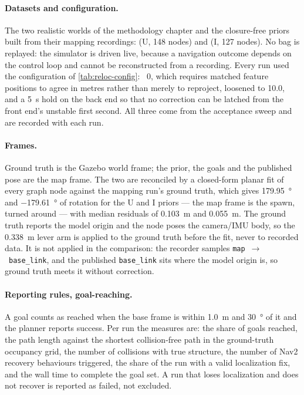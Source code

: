 \documentclass[11pt,a4paper,notitlepage]{report}
\begin{document}
\paragraph{Datasets and configuration.} The two realistic worlds of the
methodology chapter and the closure-free priors built from their mapping
recordings:  (U, 148 nodes) and
 (I, 127 nodes). No bag is replayed:
the simulator is driven live, because a navigation outcome depends on the
control loop and cannot be reconstructed from a recording. Every run used the
configuration of \cref{tab:reloc-config}: ~0, which
requires matched feature positions to agree in metres rather than merely to
reproject,  loosened to 10.0, and a
\SI{5}{\second} hold on the back end so that no correction can be latched from
the front end's unstable first second. All three come from
the acceptance sweep and are recorded with each run.

\paragraph{Frames.} Ground truth is the Gazebo world frame; the prior, the
goals and the published pose are the map frame. The two are reconciled by a
closed-form planar fit of every graph node against the mapping run's ground
truth, which gives \SI{179.95}{\degree} and \SI{-179.61}{\degree} of rotation
for the U and I priors --- the map frame is the spawn, turned around --- with
median residuals of \SI{0.103}{\metre} and \SI{0.055}{\metre}. The ground truth
reports the model origin and the node poses the camera/IMU body, so the
\SI{0.338}{\metre} lever arm is applied to the ground truth before the fit,
never to recorded data. It is not applied in the comparison: the recorder
samples \texttt{map}~$\rightarrow$~\texttt{base\_link}, and the published
\texttt{base\_link} sits where the model origin is, so ground truth meets it
without correction.

\paragraph{Reporting rules, goal-reaching.}  A
goal counts as reached when the base frame is within \SI{1.0}{\metre} and
\SI{30}{\degree} of it and the planner reports success. Per run the measures
are: the share of goals reached, the path length against the shortest
collision-free path in the ground-truth occupancy grid, the number of
collisions with true structure, the number of Nav2 recovery behaviours
triggered, the share of the run with a valid localization fix, and the wall
time to complete the goal set. A run that loses localization and does not
recover is reported as failed, not excluded.
\end{document}
